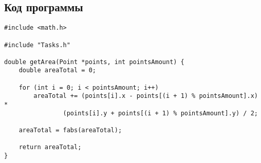 \documentclass[a4paper, 12pt, oneside]{article}
\begin{document}
    \subsection{Код программы}
    \begin{verbatim}
#include <math.h>

#include "Tasks.h"

double getArea(Point *points, int pointsAmount) {
    double areaTotal = 0;

    for (int i = 0; i < pointsAmount; i++)
        areaTotal += (points[i].x - points[(i + 1) % pointsAmount].x) *
                (points[i].y + points[(i + 1) % pointsAmount].y) / 2;

    areaTotal = fabs(areaTotal);

    return areaTotal;
}
    \end{verbatim}
\end{document}
